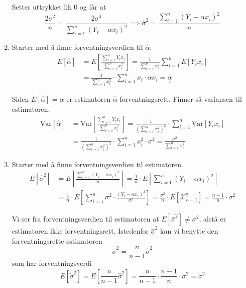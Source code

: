 \documentclass[a4paper,11pt,norsk]{article}
\begin{document}
\begin{enumerate}
        Setter uttrykket lik 0 og får at 
        \[
            \frac{2\sigma^2}{n} = \frac{2\sigma^4}{\sum_{i=1}^{n}{\left(Y_i - \alpha x_i\right)^2}} \implies \boxed{\hat{\sigma}^2 = \frac{\sum_{i=1}^{n}{\left(Y_i - \alpha x_i\right)^2}}{n}}
        \]

    \newpage
    \item Starter med å finne forventningsverdien til $\hat{\alpha}$.
        \begin{align*}
            E[\hat{\alpha}] &= E\left[\frac{\sum_{i=1}^{n}{Y_i x_i}}{\sum_{i=1}^{n}{x_i^2}}\right] = \frac{1}{\sum_{i=1}^{n}{x_i^2}} \sum_{i=1}^{n}{E[Y_i x_i]} \\ 
                            &= \frac{1}{\sum_{i=1}^{n}{x_i^2}} \cdot \sum_{i=1}^{n}{x_i \cdot \alpha x_i} = \underline{\underline{\alpha}}
        \end{align*}

        Siden $E[\hat{\alpha}] = \alpha$ er estimatoren $\hat{\alpha}$ forventningsrett. Finner så variansen til estimatoren.
        \begin{align*}
            \text{Var}[\hat{\alpha}] &= \text{Var}\left[\frac{\sum_{i=1}^{n}{Y_i x_i}}{\sum_{i=1}^{n}{x_i^2}}\right] = \frac{1}{\left(\sum_{i=1}^{n}{x_i^2}\right)^2} \cdot \sum_{i=1}^{n}{\text{Var}[Y_i x_i]} \\
                                     &= \frac{1}{\left(\sum_{i=1}^{n}{x_i^2}\right)^2} \cdot \sum_{i=1}^{n}{x_i^2 \cdot \sigma^2} = \boxed{\frac{\sigma^2}{\sum_{i=1}^{n}{x_i^2}}}
        \end{align*}

    \item Starter med å finne forventningsverdien til estimatoren.
        \begin{align*}
            E\left[\hat{\sigma}^2\right] &= E\left[\frac{\sum_{i=1}^{n}{(Y_i - \alpha x_i)^2}}{n}\right] = \frac{1}{n} \cdot E\left[\sum_{i=1}^{n}{(Y_i - \alpha x_i)^2}\right] \\ 
                                         &= \frac{1}{n} \cdot E\left[\sum_{i=1}^{n}{\sigma^2 \cdot \frac{(Y_i - \alpha x_i)^2}{\sigma^2}}\right] = \frac{\sigma^2}{n} \cdot E\left[\mathcal{X}_{n-1}^2\right] = \boxed{\frac{n-1}{n} \cdot \sigma^2}
        \end{align*}

        Vi ser fra forventningsverdien til estimatoren at $E[\hat{\sigma}^2] \neq \sigma^2$, alstå er estimatoren ikke forventningsrett. Istedenfor $\hat{\sigma}^2$ kan vi benytte den 
        forventningsrette estimatoren 
        \[
            \boxed{\tilde{\sigma}^2 = \frac{n}{n-1} \hat{\sigma}^2}
        \]
        som har forventningsverdi
        \[
            E[\tilde{\sigma}^2] = E\left[\frac{n}{n-1} \hat{\sigma}^2\right] = \frac{n}{n-1} \cdot \frac{n-1}{n} \cdot \sigma^2 = \sigma^2
        \]


\end{enumerate}
\end{document}

